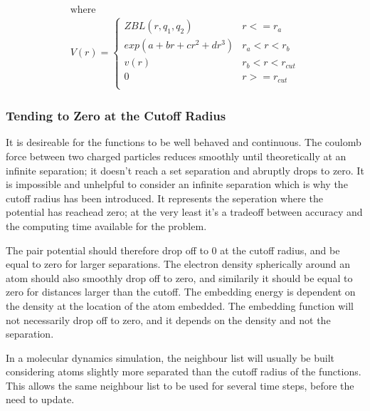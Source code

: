 \begin{equation}
\begin{split}
\text{where } \\
V(r) = \left\{ \begin{matrix} 
ZBL(r, q_1, q_2) & r<= r_a \\  
exp(a+br+cr^2 + dr^3) & r_a < r < r_b \\ 
v(r) & r_b < r < r_{cut} \\ 
0 & r >= r_{cut} \\
\end{matrix} \right . 
\end{split}
\label{eq:cubicSpline}
\end{equation}





\subsubsection{Tending to Zero at the Cutoff Radius}

It is desireable for the functions to be well behaved and continuous.  The coulomb force between two charged particles reduces smoothly until theoretically at an infinite separation; it doesn't reach a set separation and abruptly drops to zero.  It is impossible and unhelpful to consider an infinite separation which is why the cutoff radius has been introduced.  It represents the seperation where the potential has reachead zero; at the very least it's a tradeoff between accuracy and the computing time available for the problem.

The pair potential should therefore drop off to 0 at the cutoff radius, and be equal to zero for larger separations.  The electron density spherically around an atom should also smoothly drop off to zero, and similarily it should be equal to zero for distances larger than the cutoff.  The embedding energy is dependent on the density at the location of the atom embedded.  The embedding function will not necessarily drop off to zero, and it depends on the density and not the separation.

In a molecular dynamics simulation, the neighbour list will usually be built considering atoms slightly more separated than the cutoff radius of the functions.  This allows the same neighbour list to be used for several time steps, before the need to update.  








